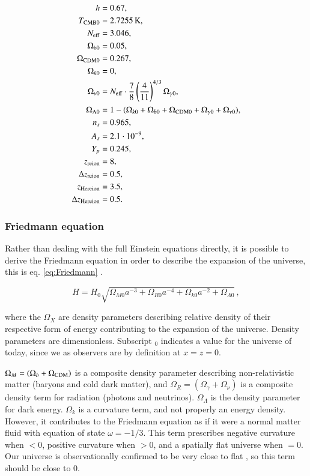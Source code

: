 \begin{equation}\label{eq:input_params}
\begin{aligned}
h &= 0.67, \\
T_{\rm CMB 0} &= 2.7255\,\unit{K}, \\
N_{\rm eff} &= 3.046, \\
\Omega_{\rm b 0} &= 0.05, \\
\Omega_{\rm CDM 0} &= 0.267,\\
\Omega_{k 0} &= 0, \\
\Omega_{\nu 0} &= N_{\rm eff}\cdot \frac{7}{8}\left(\frac{4}{11}\right)^{4/3}\Omega_{\gamma 0}, \\
\Omega_{\Lambda 0} &= 1 - (\Omega_{k 0}+\Omega_{b 0}+\Omega_{\rm CDM 0}+\Omega_{\gamma 0}+\Omega_{\nu 0}),\\
n_s &= 0.965, \\
A_s &= 2.1\cdot 10^{-9}, \\
Y_p &= 0.245, \\
z_{\rm reion} &= 8, \\
\Delta z_{\rm reion} &= 0.5, \\
z_{\rm He reion} &= 3.5, \\
\Delta z_{\rm He reion} &= 0.5.
\end{aligned}
\end{equation}

\subsubsection{Friedmann equation}
Rather than dealing with the full Einstein equations directly, it is possible to derive the Friedmann equation in order to describe the expansion of the universe, this is eq. \ref{eq:Friedmann} \citep{wintherCosmologyIILecture2024}.

\begin{equation}\label{eq:Friedmann}
\boxed{H = H_0 \sqrt{ \Omega_{M 0} a^{-3} + \Omega_{R 0} a^{-4} + \Omega_{k 0} a^{-2} + \Omega_{\Lambda 0}}}\,,
\end{equation}

where the $\Omega_{X}$ are density parameters describing relative density of their respective form of energy contributing to the expansion of the universe. Density parameters are dimensionless. Subscript $_0$ indicates a value for the universe of today, since we as observers are by definition at $x=z=0$.

$\Omega_{M} = (\Omega_{b}+\Omega_{\rm CDM})$ is a composite density parameter describing non-relativistic matter (baryons and cold dark matter), and $\Omega_{R} = (\Omega_{\gamma} + \Omega_{\nu})$ is a composite density term for radiation (photons and neutrinos).
$\Omega_{\Lambda}$ is the density parameter for dark energy.
$\Omega_{k}$ is a curvature term, and not properly an energy density. However, it contributes to the Friedmann equation as if it were a normal matter fluid with equation of state $\omega = -1/3$. This term prescribes negative curvature when $<0$, positive curvature when $>0$, and a spatially flat universe when $=0$. Our universe is observationally confirmed to be very close to flat \citep{bennettNineYearWilkinsonMicrowave2013}, so this term should be close to $0$. 

